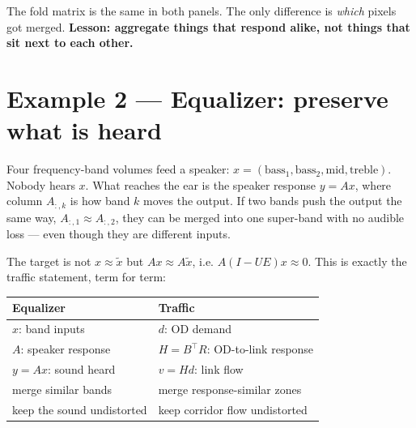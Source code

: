 \documentclass[11pt]{article}
\begin{document}
\vspace{4pt}
The fold matrix is the same in both panels. The only difference is
\emph{which} pixels got merged. \textbf{Lesson: aggregate things that respond
alike, not things that sit next to each other.}

\section*{Example 2 --- Equalizer: preserve what is heard}

Four frequency-band volumes feed a speaker:
$x=(\text{bass}_1,\text{bass}_2,\text{mid},\text{treble})$. Nobody hears $x$.
What reaches the ear is the speaker response $y = A x$, where column
$A_{:,k}$ is how band $k$ moves the output. If two bands push the output the
same way, $A_{:,1}\approx A_{:,2}$, they can be merged into one super-band
with no audible loss --- even though they are different inputs.

\begin{center}
\end{center}

\noindent The target is not $x\approx\tilde x$ but $Ax\approx A\tilde x$, i.e.
$A(I-UE)x\approx 0$. This is exactly the traffic statement, term for term:

\begin{center}
\small
\begin{tabular}{ll}
\toprule
Equalizer & Traffic \\
\midrule
$x$: band inputs & $d$: OD demand \\
$A$: speaker response & $H=B^{\!\top}R$: OD-to-link response \\
$y=Ax$: sound heard & $v=Hd$: link flow \\
merge similar bands & merge response-similar zones \\
keep the sound undistorted & keep corridor flow undistorted \\
\bottomrule
\end{tabular}
\end{center}
\end{document}
